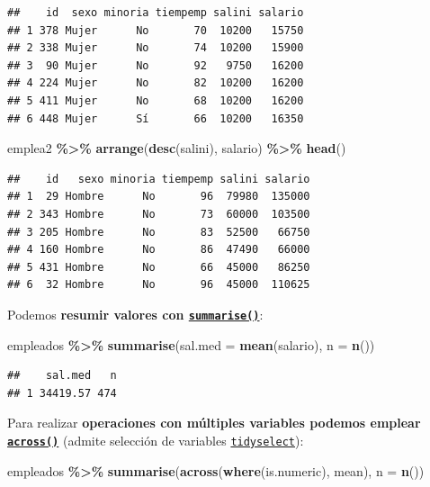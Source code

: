 \documentclass[
]{book}
\newenvironment{Shaded}{\begin{snugshade}}{\end{snugshade}}
\newcommand{\AttributeTok}[1]{\textcolor[rgb]{0.13,0.29,0.53}{#1}}
\newcommand{\FunctionTok}[1]{\textcolor[rgb]{0.13,0.29,0.53}{\textbf{#1}}}
\newcommand{\NormalTok}[1]{#1}
\newcommand{\SpecialCharTok}[1]{\textcolor[rgb]{0.81,0.36,0.00}{\textbf{#1}}}
\begin{document}
\begin{verbatim}
##    id  sexo minoria tiempemp salini salario
## 1 378 Mujer      No       70  10200   15750
## 2 338 Mujer      No       74  10200   15900
## 3  90 Mujer      No       92   9750   16200
## 4 224 Mujer      No       82  10200   16200
## 5 411 Mujer      No       68  10200   16200
## 6 448 Mujer      Sí       66  10200   16350
\end{verbatim}

\begin{Shaded}
\begin{Highlighting}[]
\NormalTok{emplea2 }\SpecialCharTok{\%\textgreater{}\%} \FunctionTok{arrange}\NormalTok{(}\FunctionTok{desc}\NormalTok{(salini), salario) }\SpecialCharTok{\%\textgreater{}\%} \FunctionTok{head}\NormalTok{()}
\end{Highlighting}
\end{Shaded}

\begin{verbatim}
##    id   sexo minoria tiempemp salini salario
## 1  29 Hombre      No       96  79980  135000
## 2 343 Hombre      No       73  60000  103500
## 3 205 Hombre      No       83  52500   66750
## 4 160 Hombre      No       86  47490   66000
## 5 431 Hombre      No       66  45000   86250
## 6  32 Hombre      No       96  45000  110625
\end{verbatim}

Podemos \textbf{resumir valores con \href{https://dplyr.tidyverse.org/reference/summarise.html}{\texttt{summarise()}}}:

\begin{Shaded}
\begin{Highlighting}[]
\NormalTok{empleados }\SpecialCharTok{\%\textgreater{}\%} \FunctionTok{summarise}\NormalTok{(}\AttributeTok{sal.med =} \FunctionTok{mean}\NormalTok{(salario), }\AttributeTok{n =} \FunctionTok{n}\NormalTok{())}
\end{Highlighting}
\end{Shaded}

\begin{verbatim}
##    sal.med   n
## 1 34419.57 474
\end{verbatim}

Para realizar \textbf{operaciones con múltiples variables podemos emplear \href{https://dplyr.tidyverse.org/reference/across.html}{\texttt{across()}}} (admite selección de variables \href{https://tidyselect.r-lib.org}{\texttt{tidyselect}}):

\begin{Shaded}
\begin{Highlighting}[]
\NormalTok{empleados }\SpecialCharTok{\%\textgreater{}\%} \FunctionTok{summarise}\NormalTok{(}\FunctionTok{across}\NormalTok{(}\FunctionTok{where}\NormalTok{(is.numeric), mean), }\AttributeTok{n =} \FunctionTok{n}\NormalTok{())}
\end{Highlighting}
\end{Shaded}
\end{document}
